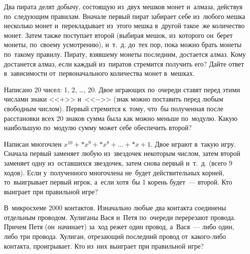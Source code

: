 \begin{problems}
\item
Два пирата делят добычу, состоящую из~двух мешков монет и~алмаза, действуя
по~следующим правилам.
Вначале первый пират забирает себе из~любого мешка несколько монет
и~перекладывает из~этого мешка в~другой такое~же количество монет.
Затем также поступает второй (выбирая мешок, из~которого он~берет монеты,
по~своему усмотрению), и~т.~д. до~тех пор, пока можно брать монеты по~такому
правилу.
Пирату, взявшему монеты последним, достается алмаз.
Кому достанется алмаз, если каждый из~пиратов стремится получить его?
Дайте ответ в~зависимости от~первоначального количества монет в~мешках.

\item
Написано 20 чисел: 1, 2, \ldots, 20.
Двое играющих по~очереди ставят перед этими числами знаки <<$+$>> и~<<$-$>>
(знак можно поставить перед любым свободным числом).
Первый стремится к~тому, что~бы полученная после расстановки всех 20 знаков
сумма была как можно меньше по~модулю.
Какую наибольшую по~модулю сумму может себе обеспечить второй?

\item
Написан многочлен $x^{10} + * x^9 + * x^8 + \ldots + * x + 1$.
Двое играют в~такую игру.
Сначала первый заменяет любую из~звездочек некоторым числом, затем второй
заменяет одну из~оставшихся звездочек, затем снова первый и~т.~д.
(всего 9 ходов).
Если у~полученного многочлена не~будет действительных корней, то~выигрывает
первый игрок, а~если хотя~бы 1 корень будет~--- второй.
Кто выиграет при правильной игре?

\item
В~микросхеме 2000 контактов.
Изначально любые два контакта соединены отдельным проводом.
Хулиганы Вася и~Петя по~очереди перерезают провода.
Причем Петя (он~начинает) за~ход режет один провод, а~Вася~--- либо один, либо
три провода.
Хулиган, отрезающий последний провод от~какого-либо контакта, проигрывает.
Кто из~них выиграет при правильной игре?

\end{problems}

